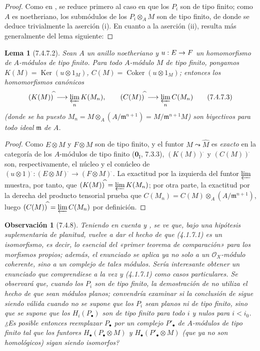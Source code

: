 \documentclass[10pt,oneside,openany]{book}
\theoremstyle{egaenv}\newtheorem*{env}{---}
\theoremstyle{egastatement}
\newtheorem*{lemma}{Lema}
\theoremstyle{egadescription}
\newtheorem*{remark}{Observación}
\renewcommand{\to}{\mathchoice{\longrightarrow}{\rightarrow}{\rightarrow}{\rightarrow}}
\begin{document}
\begin{proof}
Como en , se reduce primero al caso en que los $P_i$ son de
tipo finito; como $A$ es noetheriano, los submódulos de los
$P_i\otimes_A M$ son de tipo finito, de donde se deduce trivialmente la
aserción (i). En cuanto a la aserción (ii), resulta más generalmente del lema
siguiente:
\end{proof}

\begin{lemma}[7.4.7.2]
\label{III.7.4.7.2}
Sean $A$ un anillo noetheriano y $u:E\to F$ un homomorfismo de $A$-módulos de
tipo finito. Para todo $A$-módulo $M$ de tipo finito, pongamos
$K(M)=\operatorname{Ker}(u\otimes1_M)$,
$C(M)=\operatorname{Coker}(u\otimes1_M)$;
entonces los homomorfismos canónicos
\[
  (K(M))^{\widehat{\,}}\longrightarrow\varprojlim_n K(M_n),
  \qquad
  (C(M))^{\widehat{\,}}\longrightarrow\varprojlim_n C(M_n)
  \tag{7.4.7.3}\label{III.7.4.7.3.fr}
\]
(donde se ha puesto
$M_n=M\otimes_A(A/\mathfrak m^{n+1})=M/\mathfrak m^{n+1}M$) son biyectivos
para todo ideal $\mathfrak m$ de $A$.
\end{lemma}

\begin{proof}
Como $E\otimes M$ y $F\otimes M$ son de tipo finito, y el funtor
$M\leadsto\widehat M$ es \emph{exacto} en la categoría de los $A$-módulos de tipo finito
($\mathbf{0}_{\mathrm I}$, 7.3.3), $(K(M))^{\widehat{\,}}$ y $(C(M))^{\widehat{\,}}$ son,
respectivamente, el núcleo y el conúcleo de
$(u\otimes1)^{\widehat{\,}}:(E\otimes M)^{\widehat{\,}}\longrightarrow(F\otimes M)^{\widehat{\,}}$.
La exactitud por la izquierda del funtor $\varprojlim$ muestra, por tanto, que
$(K(M))^{\widehat{\,}}=\varprojlim K(M_n)$; por otra parte, la exactitud por la
derecha del producto tensorial prueba que
$C(M_n)=C(M)\otimes_A(A/\mathfrak m^{n+1})$, luego
$(C(M))^{\widehat{\,}}=\varprojlim C(M_n)$ por definición.
\end{proof}

\begin{remark}[7.4.8]
\label{III.7.4.8}
Teniendo en cuenta  y , se ve que, bajo una
hipótesis suplementaria de planitud,  vuelve a dar el hecho de
que (4.1.7.1) es un isomorfismo, es decir, lo esencial del «primer teorema de
comparación» para los morfismos propios; además, el enunciado se aplica ya no
solo a un $\mathscr O_X$-módulo coherente, sino a un \emph{complejo} de tales módulos.
Sería interesante obtener un enunciado que comprendiese a la vez
 y (4.1.7.1) como casos particulares. Se observará que, cuando los
$P_i$ son de tipo finito, la demostración de  no utiliza el
hecho de que sean módulos planos; convendría examinar si la conclusión de
 sigue siendo válida cuando no se supone que los $P_i$ sean
planos ni de tipo finito, sino que se supone que los $H_i(P_\bullet)$ son de
tipo finito para todo $i$ y nulos para $i<i_0$. ¿Es posible entonces reemplazar
$P_\bullet$ por un complejo $P'_\bullet$ de $A$-módulos de tipo finito tal que
los funtores $H_\bullet(P_\bullet\otimes M)$ y
$H_\bullet(P'_\bullet\otimes M)$ (que ya no son homológicos) sigan siendo
isomorfos?
\end{remark}
\end{document}
